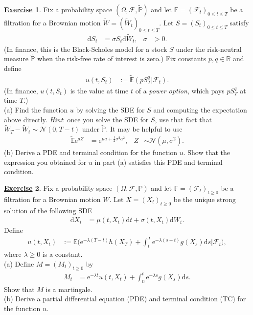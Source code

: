 \documentclass[12pt]{book}
\numberwithin{equation}{chapter}
\theoremstyle{plain}
\numberwithin{theorem}{section}
\theoremstyle{definition}
\newtheorem{exercise}{\underline{Exercise}}
\numberwithin{exercise}{chapter}
\newcommand{\<}{\langle}
\renewcommand{\>}{\rangle}
\renewcommand{\(}{\left(}
\renewcommand{\)}{\right)}
\renewcommand{\[}{\left[}
\renewcommand{\]}{\right]}
\newcommand\Eb{\mathds{E}}
\newcommand\Fb{\mathds{F}}
\newcommand\Pb{\mathds{P}}
\newcommand\Rb{\mathds{R}}
\newcommand\Fc{\mathscr{F}}
\newcommand\Nc{\mathscr{N}}
\newcommand\Om{\Omega}
\newcommand\sig{\sigma}
\newcommand\lam{\lambda}
\newcommand\Ebt{\widetilde{\Eb}}
\newcommand\Pbt{\widetilde{\Pb}}
\newcommand\Wt{\widetilde{W}}
\newcommand\dd{\mathrm{d}}
\newcommand\ee{\mathrm{e}}
\begin{document}
\begin{exercise}
\label{exer:9.8}
Fix a probability space $(\Om, \Fc, \Pbt)$ and let $\Fb = (\Fc_t)_{0 \leq t \leq T}$ be a filtration for a Brownian motion $\Wt = (\Wt_t)_{0 \leq t \leq T}$.  Let $S = (S_t)_{0 \leq t \leq T}$ satisfy
\begin{align}
\dd S_t
	&=	\sig S_t \dd \Wt_t , &
\sig
	&> 0 .
\end{align}
(In finance, this is the Black-Scholes model for a stock $S$ under the risk-neutral measure $\Pbt$ when the risk-free rate of interest is zero.)
Fix constants $p, q \in \Rb$ and define
\begin{align}
u(t,S_t)
	&:=	\Ebt( p S_T^q | \Fc_t ) .
\end{align}
(In finance, $u(t,S_t)$ is the value at time $t$ of a \textit{power option}, which pays $p S_T^q$ at time $T$.)\\
(a) Find the function $u$ by solving the SDE for $S$ and computing the expectation above directly.  \textit{Hint}: once you solve the SDE for $S$, use that fact that $\Wt_T - \Wt_t \sim \Nc( 0 ,T-t)$ under $\Pbt$. It may be helpful to use
\begin{align}
\Ebt \ee^{a Z}
	&=	\ee^{\mu a + \tfrac{1}{2} \sig^2 a^2} , &
Z
	&\sim \Nc( \mu , \sig^2 ) .
\end{align}
(b) Derive a PDE and terminal condition for the function $u$.  Show that the expression you obtained for $u$ in part (a) satisfies this PDE and terminal condition.
\end{exercise}

\begin{exercise}
\label{exer:9.9}
Fix a probability space $(\Om,\Fc,\Pb)$ and let $\Fb = (\Fc_t)_{t \geq 0}$ be a filtration for a Brownian motion $W$.
Let $X = (X_t)_{t \geq 0}$ be the unique strong solution of the following SDE
\begin{align}
\dd X_t
	&=	\mu(t,X_t) \dd t + \sig(t,X_t) \dd W_t .
\end{align}
Define
\begin{align}
u(t,X_t)
	&:=	\Eb \Big( \ee^{- \lam (T-t)} h(X_T) + \int_t^T \ee^{- \lam (s-t)} g(X_s) \dd s \Big| \Fc_t \Big) ,
\end{align}
where $\lam \geq 0$ is a constant.
\\[0.5em]
(a) Define $M = (M_t)_{t \geq 0}$ by
\begin{align}
M_t
	&=	\ee^{- \lam t} u(t,X_t) + \int_0^t \ee^{- \lam s} g(X_s) \dd s .
\end{align}
Show that $M$ is a martingale.
\\[0.5em]
(b) Derive a partial differential equation (PDE) and terminal condition (TC) for the function $u$.
\end{exercise}
\end{document}
